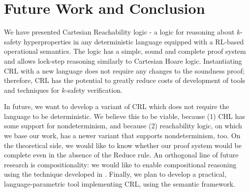 \section{Future Work and Conclusion}

We have presented Cartesian Reachability logic - a logic for reasoning about $k$-safety hyperproperties
in any deterministic language equipped with a RL-based operational semantics.
The logic has a simple, sound and complete proof system and allows lock-step reasoning
similarly to Cartesian Hoare logic.
Instantiating CRL with a new language does not require any changes to the soundness proof;
therefore, CRL has the potential to greatly reduce costs of development of tools and techniques for $k$-safety verification.

In future, we want to develop a variant of CRL which does not require the language to be deterministic.
We believe this to be viable, because (1) CHL has some support for nondeterminism,
and because (2) reachability logic, on which we base our work, has a newer variant that supports nondeterminism, too.
On the theoretical side, we would like to know whether our proof system would be complete even in the absence of
the Reduce rule.
An orthogonal line of future research is compositionality: we would like to enable compositional reasoning
using the technique developed in \cite{DOsualdoFD22}.
Finally, we plan to develop a practical, language-parametric tool implementing CRL, using the \K{} semantic framework.
